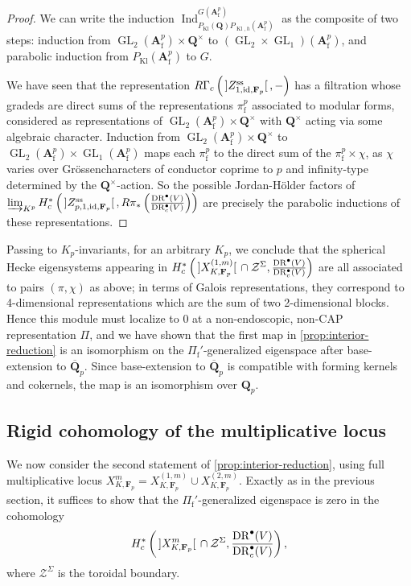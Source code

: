 \documentclass[cjm]{ipart}
\theoremstyle{plain}
\theoremstyle{remark}
\DeclareMathOperator{\DR}{DR}
\DeclareMathOperator{\GL}{GL}
\DeclareMathOperator{\id}{id}
\DeclareMathOperator{\Kl}{Kl}
\DeclarePairedDelimiter{\tb}{{\,]}}{{[\, }} %
\newcommand{\Af}{\AA_{\mathrm{f}}}
\newcommand{\Fp}{\mathbf{F}_p}
\newcommand{\Pif}{\Pi_{\mathrm{f}}}
\newcommand{\QQbar}{\overline{\QQ}}
\newcommand{\QQ}{\mathbf{Q}}
\newcommand{\Qp}{\QQ_p}
\renewcommand{\AA}{\mathbf{A}}
\numberwithin{equation}{subsection}
\begin{document}
  \begin{proof}
   We can write the induction $\operatorname{Ind}_{P_{\Kl}(\QQ) P_{\Kl, h}(\Af^p)}^{G(\Af^p)}$ as the composite of two steps: induction from $\GL_2(\Af^p) \times \QQ^\times$ to $(\GL_2 \times \GL_1)(\Af^p)$, and parabolic induction from $P_{\Kl}(\Af^p)$ to $G$.
   
   We have seen that the representation $R\Gamma_c \left(\tb{Z_{1, \id, \Fp}^{\mathrm{ss}}}, -\right)$ has a filtration whose gradeds are direct sums of the representations $\pi_{\mathrm{f}}^p$ associated to modular forms, considered as representations of $\GL_2(\Af^p) \times \QQ^\times$ with $\QQ^\times$ acting via some algebraic character. Induction from $\GL_2(\Af^p) \times \QQ^\times$ to $\GL_2(\Af^p) \times \GL_1(\Af^p)$ maps each $\pi_{\mathrm{f}}^p$ to the direct sum of the $\pi_{\mathrm{f}}^p \times \chi$, as $\chi$ varies over Gr\"ossencharacters of conductor coprime to $p$ and infinity-type determined by the $\QQ^\times$-action. So the possible Jordan-H\"older factors of $\varinjlim_{K^p} H^*_{c}\left(\tb{Z_{p, 1, \mathrm{id}, \Fp}^{\mathrm{ss}}}, R\pi_*\left( \frac{\DR^\bullet(V)}{\DR^\bullet_c(V)} \right)\right)$ are precisely the parabolic inductions of these representations. 
  \end{proof}
  
  Passing to $K_p$-invariants, for an arbitrary $K_p$, we conclude that the spherical Hecke eigensystems appearing in $H^*_{c}\left(\tb{X_{K, \Fp}^{(1, m)}} \cap \mathcal{Z}^{\Sigma}, \frac{\DR^\bullet(V)}{\DR^\bullet_c(V)}\right)$ are all associated to pairs $(\pi, \chi)$ as above; in terms of Galois representations, they correspond to 4-dimensional representations which are the sum of two 2-dimensional blocks. Hence this module must localize to 0 at a non-endoscopic, non-CAP representation $\Pi$, and we have shown that the first map in \cref{prop:interior-reduction} is an isomorphism on the $\Pif'$-generalized eigenspace after base-extension to $\QQbar_p$. Since base-extension to $\QQbar_p$ is compatible with forming kernels and cokernels, the map is an isomorphism over $\Qp$.

 \subsection{Rigid cohomology of the multiplicative locus}

  We now consider the second statement of \cref{prop:interior-reduction}, using full multiplicative locus $X_{K, \Fp}^m = X_{K, \Fp}^{(1, m)} \cup X_{K, \Fp}^{(2, m)}$. Exactly as in the previous section, it suffices to show that the $\Pif'$-generalized eigenspace is zero in the cohomology
  \[ H^*_{c}\left(\tb{X_{K, \Fp}^{m}} \cap \mathcal{Z}^{\Sigma}, \frac{\DR^\bullet(V)}{\DR^\bullet_c(V)}\right),\]
  where $\mathcal{Z}^{\Sigma}$ is the toroidal boundary.
  
\end{document}
